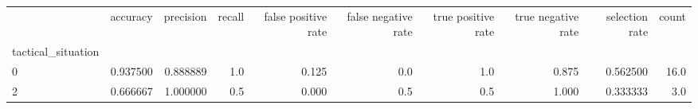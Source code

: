 \begin{tabular}{lrrrrrrrrr}
\toprule
{} &  accuracy &  precision &  recall &  false positive rate &  false negative rate &  true positive rate &  true negative rate &  selection rate &  count \\
tactical\_situation &           &            &         &                      &                      &                     &                     &                 &        \\
\midrule
0                  &  0.937500 &   0.888889 &     1.0 &                0.125 &                  0.0 &                 1.0 &               0.875 &        0.562500 &   16.0 \\
2                  &  0.666667 &   1.000000 &     0.5 &                0.000 &                  0.5 &                 0.5 &               1.000 &        0.333333 &    3.0 \\
\bottomrule
\end{tabular}
